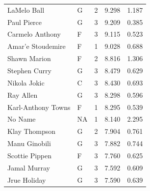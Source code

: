 \begin{table}[t]
\begin{tabular*}{\linewidth}{@{\extracolsep{\fill}}llcrr}
LaMelo Ball & G & 2 & 9.298 & 1.187 \\ 
Paul Pierce & G & 3 & 9.209 & 0.385 \\ 
Carmelo Anthony & F & 3 & 9.115 & 0.523 \\ 
Amar'e Stoudemire & F & 1 & 9.028 & 0.688 \\ 
Shawn Marion & F & 2 & 8.816 & 1.306 \\ 
Stephen Curry & G & 3 & 8.479 & 0.629 \\ 
Nikola Jokic & C & 3 & 8.430 & 0.693 \\ 
Ray Allen & G & 3 & 8.298 & 0.596 \\ 
Karl-Anthony Towns & F & 1 & 8.295 & 0.539 \\ 
No Name & NA & 1 & 8.140 & 2.295 \\ 
Klay Thompson & G & 2 & 7.904 & 0.761 \\ 
Manu Ginobili & G & 3 & 7.882 & 0.744 \\ 
Scottie Pippen & F & 3 & 7.760 & 0.625 \\ 
Jamal Murray & G & 3 & 7.592 & 0.609 \\ 
Jrue Holiday & G & 3 & 7.590 & 0.639 \\ 
\bottomrule
\end{tabular*}
\end{table}


